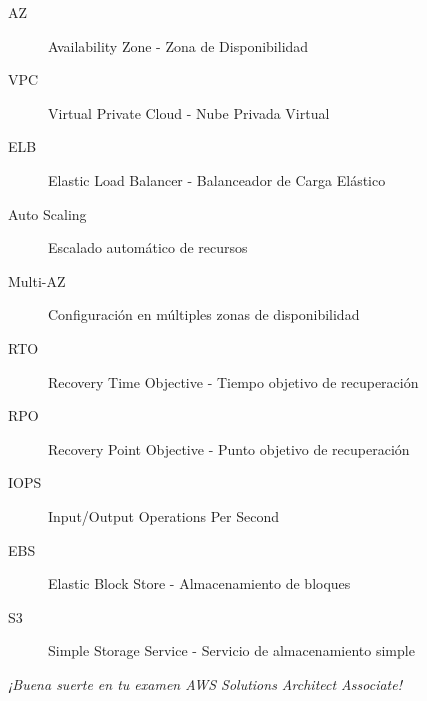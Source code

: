 \documentclass[12pt,a4paper]{report}
\begin{document}
\begin{description}
    \item[AZ] Availability Zone - Zona de Disponibilidad
    \item[VPC] Virtual Private Cloud - Nube Privada Virtual  
    \item[ELB] Elastic Load Balancer - Balanceador de Carga Elástico
    \item[Auto Scaling] Escalado automático de recursos
    \item[Multi-AZ] Configuración en múltiples zonas de disponibilidad
    \item[RTO] Recovery Time Objective - Tiempo objetivo de recuperación
    \item[RPO] Recovery Point Objective - Punto objetivo de recuperación
    \item[IOPS] Input/Output Operations Per Second
    \item[EBS] Elastic Block Store - Almacenamiento de bloques
    \item[S3] Simple Storage Service - Servicio de almacenamiento simple
\end{description}

\vfill

\begin{center}
\textit{¡Buena suerte en tu examen AWS Solutions Architect Associate!}

\vspace{1cm}

\textcolor{awsorange}{\Large \faAws}
\end{center}
\end{document}
